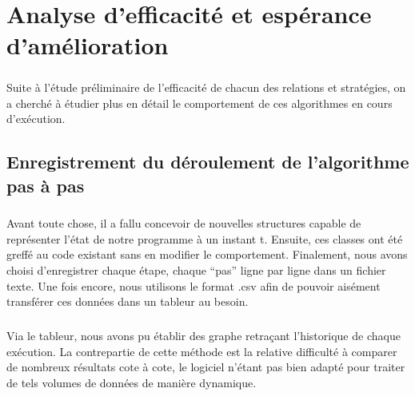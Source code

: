\documentclass[a4paper,10pt]{report}
\begin{document}
\chapter{Analyse d'efficacité et espérance d'amélioration}

\paragraph{}
  Suite à l'étude préliminaire de l'efficacité de chacun des relations et stratégies, on a cherché à étudier
plus en détail le comportement de ces algorithmes en cours d'exécution.

\section{Enregistrement du déroulement de l'algorithme pas à pas}

\paragraph{}
  Avant toute chose, il a fallu concevoir de nouvelles structures capable de représenter l'état de notre programme
à un instant t. Ensuite, ces classes ont été greffé au code existant sans en modifier le comportement. Finalement,
nous avons choisi d'enregistrer chaque étape, chaque ``pas'' ligne par ligne dans un fichier texte. Une fois encore,
nous utilisons le format .csv afin de pouvoir aisément transférer ces données dans un tableur au besoin.

\paragraph{}
  Via le tableur, nous avons pu établir des graphe retraçant l'historique de chaque exécution. La contrepartie de
cette méthode est la relative difficulté à comparer de nombreux résultats cote à cote, le logiciel n'étant pas
bien adapté pour traiter de tels volumes de données de manière dynamique.
\end{document}
